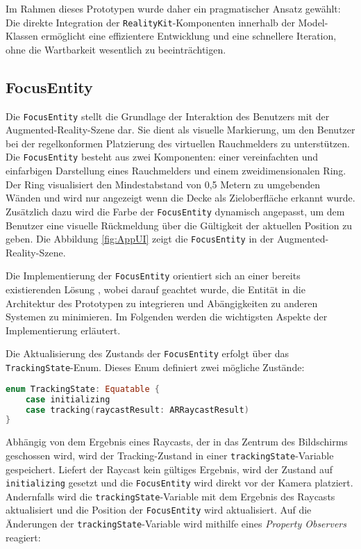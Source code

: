 Im Rahmen dieses Prototypen wurde daher ein pragmatischer Ansatz gewählt: Die direkte Integration der \texttt{RealityKit}-Komponenten innerhalb der Model-Klassen ermöglicht eine effizientere Entwicklung und eine schnellere Iteration, ohne die Wartbarkeit wesentlich zu beeinträchtigen.

\subsection{FocusEntity}

Die \texttt{FocusEntity} stellt die Grundlage der Interaktion des Benutzers mit der Augmented-Reality-Szene dar. Sie dient als visuelle Markierung, um den Benutzer bei der regelkonformen Platzierung des virtuellen Rauchmelders zu unterstützen. Die \texttt{FocusEntity} besteht aus zwei Komponenten: einer vereinfachten und einfarbigen Darstellung eines Rauchmelders und einem zweidimensionalen Ring. Der Ring visualisiert den Mindestabstand von 0,5 Metern zu umgebenden Wänden und wird nur angezeigt wenn die Decke als Zieloberfläche erkannt wurde. Zusätzlich dazu wird die Farbe der \texttt{FocusEntity} dynamisch angepasst, um dem Benutzer eine visuelle Rückmeldung über die Gültigkeit der aktuellen Position zu geben. Die Abbildung \ref{fig:AppUI} zeigt die \texttt{FocusEntity} in der Augmented-Reality-Szene.

Die Implementierung der \texttt{FocusEntity} orientiert sich an einer bereits existierenden Lösung \cite{cobb2019focusEntity}, wobei darauf geachtet wurde, die Entität in die Architektur des Prototypen zu integrieren und Abängigkeiten zu anderen Systemen zu minimieren. Im Folgenden werden die wichtigsten Aspekte der Implementierung erläutert.

Die Aktualisierung des Zustands der \texttt{FocusEntity} erfolgt über das \texttt{TrackingState}-Enum. Dieses Enum definiert zwei mögliche Zustände:

\begin{lstlisting}[language=Swift]
enum TrackingState: Equatable {
    case initializing
    case tracking(raycastResult: ARRaycastResult)
}
\end{lstlisting}

Abhängig von dem Ergebnis eines Raycasts, der in das Zentrum des Bildschirms geschossen wird, wird der Tracking-Zustand in einer \texttt{trackingState}-Variable gespeichert. Liefert der Raycast kein gültiges Ergebnis, wird der Zustand auf \texttt{initializing} gesetzt und die \texttt{FocusEntity} wird direkt vor der Kamera platziert. Andernfalls wird die \texttt{trackingState}-Variable mit dem Ergebnis des Raycasts aktualisiert und die Position der \texttt{FocusEntity} wird aktualisiert. Auf die Änderungen der \texttt{trackingState}-Variable wird mithilfe eines \textit{Property Observers} reagiert: 

